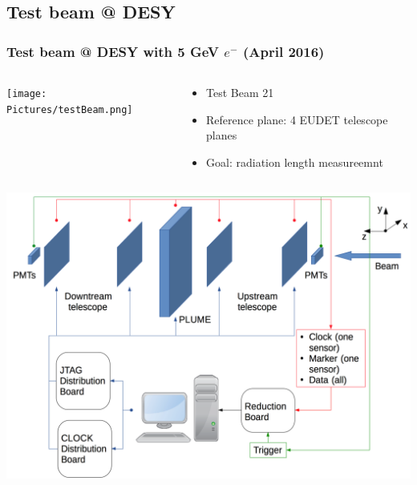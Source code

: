\documentclass{beamer}
\begin{document}
    \subsection{Test beam @ DESY}

    \begin{frame}
      \frametitle{Test beam @ DESY with 5 GeV $e^-$ (April 2016)}
      
      \begin{columns}[t]
        \begin{column}{5cm}
          \begin{center}
            \texttt{[image: Pictures/testBeam.png]}
          \end{center}
        \end{column}
        \begin{column}{5cm}
          \begin{itemize}
            \item Test Beam 21
            \item Reference plane: 4 EUDET telescope planes
            \item Goal: radiation length measureemnt
          \end{itemize}
        \end{column}
      \end{columns}
    \end{frame}

    \begin{frame}

      \begin{center}
        \includegraphics[width = \textwidth]{Pictures/testBeamAcquisition.png}
      \end{center}
    \end{frame}
\end{document}
